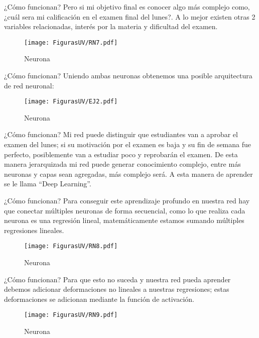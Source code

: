 \documentclass[10pt]{beamer}
\begin{document}
\begin{frame}{¿Cómo funcionan?}
Pero si mi objetivo final es conocer algo más complejo como, ¿cuál sera mi calificación en el examen final del lunes?. A lo mejor existen otras 2 variables relacionadas, interés por la materia y dificultad del examen.

\begin{figure}[h!]
  \centering
  \texttt{[image: FigurasUV/RN7.pdf]}
  \caption{Neurona}
\end{figure}

\end{frame}

\begin{frame}{¿Cómo funcionan?}
Uniendo ambas neuronas obtenemos una posible arquitectura de  red neuronal:
\begin{figure}[h!]
  \centering
  \texttt{[image: FigurasUV/EJ2.pdf]}
  \caption{Neurona}
\end{figure}

\end{frame}

\begin{frame}{¿Cómo funcionan?}
Mi red puede distinguir que estudiantes van a aprobar el examen del lunes; si su motivación por el examen es baja y su fin de semana fue perfecto, posiblemente van a estudiar poco y reprobarán el examen. De esta manera jerarquizada mi red puede generar conocimiento complejo, entre más neuronas y capas sean agregadas, más complejo será. A esta manera de aprender se le llama ``Deep Learning''.

\end{frame}


\begin{frame}{¿Cómo funcionan?}
Para conseguir este aprendizaje profundo en nuestra red hay que conectar múltiples neuronas de forma secuencial, como lo que realiza cada neurona es una regresión lineal, matemáticamente estamos sumando múltiples regresiones lineales.

\begin{figure}[h!]
  \centering
  \texttt{[image: FigurasUV/RN8.pdf]}
  \caption{Neurona}
\end{figure}

\end{frame}

\begin{frame}{¿Cómo funcionan?}
Para que esto no suceda y nuestra red pueda aprender debemos adicionar deformaciones no lineales a nuestras regresiones; estas deformaciones se adicionan mediante la función de activación. 

\begin{figure}[h!]
  \centering
  \texttt{[image: FigurasUV/RN9.pdf]}
  \caption{Neurona}
\end{figure}

\end{frame}
\end{document}
